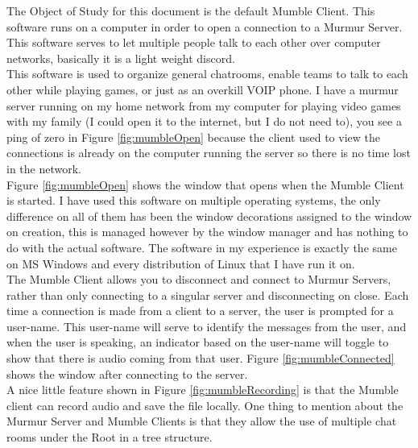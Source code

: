 \documentclass[twoside, titlepage]{article}
\begin{document}
	\begin{minipage}{0.5\textwidth}
		The Object of Study for this document is the
		default Mumble Client. This software runs on
		a computer in order to open a connection to
		a Murmur Server. This software serves to let
		multiple people talk to each other over computer
		networks, basically it is a light weight discord.\\
		
		
		This software is used to organize general chatrooms,
		enable teams to talk to each other while playing
		games, or just as an overkill VOIP phone. I have
		a murmur server running on my home network from
		my computer for playing video games with my family
		(I could open it to the internet, but I do not need
		to), you see a ping of zero in Figure \ref{fig:mumbleOpen} because the client used to view
		the connections is already on the computer running the
		server so there is no time lost in the network.\\
		
		
		Figure \ref{fig:mumbleOpen} shows the window that opens
		when the Mumble Client is started. I have used this
		software on multiple operating systems, the only
		difference on all of them has been the
		window decorations assigned to the window on
		creation, this is managed however by the window
		manager and has nothing to do with the actual
		software. The software in my experience is exactly
		the same on MS Windows and every distribution
		of Linux that I have run it on.\\
		
		The Mumble Client allows you to disconnect and connect
		to Murmur Servers, rather than only connecting to a
		singular server and disconnecting on close. Each time
		a connection is made from a client to a server, the
		user is prompted for a user-name. This user-name will
		serve to identify the messages from the user, and
		when the user is speaking, an indicator based on the
		user-name will toggle to show that there is audio
		coming from that user. Figure \ref{fig:mumbleConnected}
		shows the window after connecting to the server.\\
		
		A nice little feature shown in Figure
		\ref{fig:mumbleRecording} is that the Mumble client
		can record audio and save the file locally. One thing
		to mention about the Murmur Server and Mumble Clients
		is that they allow the use of multiple chat rooms under
		the Root in a tree structure.
	\end{minipage}
\end{document}
